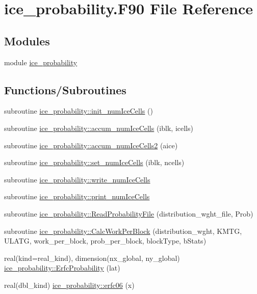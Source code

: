 \hypertarget{ice__probability_8F90}{
\section{ice\_\-probability.F90 File Reference}
\label{ice__probability_8F90}
}
\subsection*{Modules}
\begin{DoxyCompactItemize}
\item 
module \hyperlink{namespaceice__probability}{ice\_\-probability}
\end{DoxyCompactItemize}
\subsection*{Functions/Subroutines}
\begin{DoxyCompactItemize}
\item 
subroutine \hyperlink{namespaceice__probability_a4df379181c71e4ceeb1ef127de0dace0}{ice\_\-probability::init\_\-numIceCells} ()
\item 
subroutine \hyperlink{namespaceice__probability_af4690e52bcf824f65d95ef537d2820b2}{ice\_\-probability::accum\_\-numIceCells} (iblk, icells)
\item 
subroutine \hyperlink{namespaceice__probability_ab54f919c558a646e53b7587961da2c48}{ice\_\-probability::accum\_\-numIceCells2} (aice)
\item 
subroutine \hyperlink{namespaceice__probability_af08e27cf4323fd5da1b0920c8e9b6532}{ice\_\-probability::set\_\-numIceCells} (iblk, ncells)
\item 
subroutine \hyperlink{namespaceice__probability_ad845a3b0d89f3988e7360443aaade9c8}{ice\_\-probability::write\_\-numIceCells}
\item 
subroutine \hyperlink{namespaceice__probability_aecdab917ec3ada7a8242d8fd3a57aa8c}{ice\_\-probability::print\_\-numIceCells}
\item 
subroutine \hyperlink{namespaceice__probability_aae3f520676ae6acd850363f60f637c3f}{ice\_\-probability::ReadProbabilityFile} (distribution\_\-wght\_\-file, Prob)
\item 
subroutine \hyperlink{namespaceice__probability_ab5d1ecab27a5c7e3ba4a1fc39af3adcc}{ice\_\-probability::CalcWorkPerBlock} (distribution\_\-wght, KMTG, ULATG, work\_\-per\_\-block, prob\_\-per\_\-block, blockType, bStats)
\item 
real(kind=real\_\-kind), dimension(nx\_\-global, ny\_\-global) \hyperlink{namespaceice__probability_a46608f3ec8b2296b8d5fac3dc7822255}{ice\_\-probability::ErfcProbability} (lat)
\item 
real(dbl\_\-kind) \hyperlink{namespaceice__probability_af2adb80d8ffb5383c91ab49ece3f2832}{ice\_\-probability::erfc06} (x)
\end{DoxyCompactItemize}
